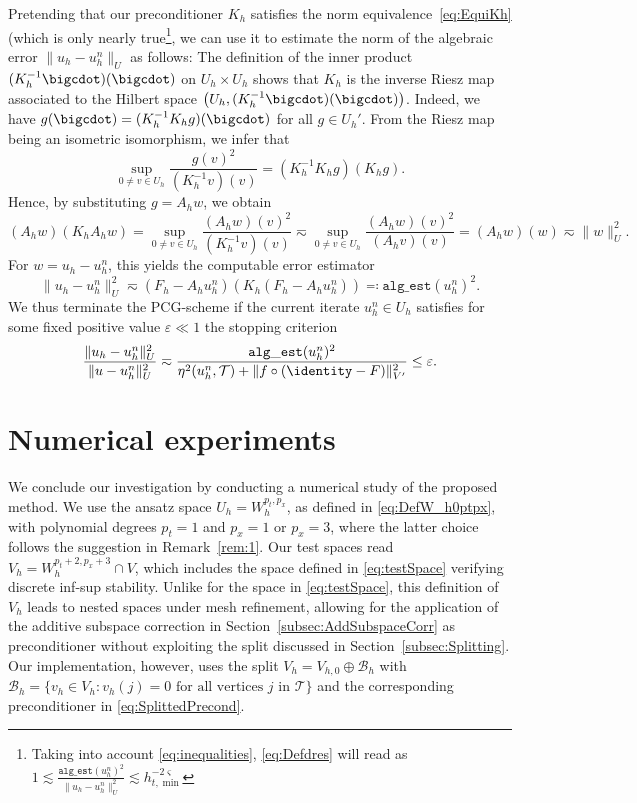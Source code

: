 \documentclass{amsart}
\providecommand{\tria}{\mathcal{T}}
\begin{document}
Pretending that our preconditioner $K_h$ satisfies the norm equivalence~\eqref{eq:EquiKh} (which is only nearly true\footnote{Taking into account \eqref{eq:inequalities}, \eqref{eq:Defdres} will read as $1 \lesssim \frac{\mathtt{alg\_est}(u_h^n)^2}{\lVert u_h - u_h^n \rVert_U^2} \lesssim h_{t,\min}^{-2\varsigma}$}, we can use it to estimate the norm of the algebraic error $\lVert u_h - u_h^n \rVert_U$ as follows:
The definition of the inner product $(K_h^{-1}\bigcdot)(\bigcdot)$ on $U_h \times U_h$ shows that $K_h$ is the inverse Riesz map associated to the Hilbert space $\big(U_h,(K_h^{-1}\bigcdot)(\bigcdot)\big)$. Indeed, we have $g(\bigcdot)=(K_h^{-1}K_h g)(\bigcdot)$ for all $g \in U_h'$.
From the Riesz map being an isometric isomorphism, we infer that
\begin{equation*}
\sup_{0 \neq v \in U_h}\frac{g(v)^2}{(K_h^{-1}v)(v)}=(K_h^{-1} K_h g)(K_h g).
\end{equation*}
Hence, by substituting $g=A_h w$, we obtain
\begin{equation*}
(A_h w)(K_h A_h w) =\sup_{0 \neq v \in U_h}\frac{(A_h w)(v)^2}{(K_h^{-1}v)(v)} \eqsim \sup_{0 \neq v \in U_h}\frac{(A_h w)(v)^2}{(A_h v)(v)}= (A_h w)(w) \eqsim \|w\|_U^2.
\end{equation*}
For $w=u_h - u_h^n$, this yields the computable error estimator
\begin{equation}\label{eq:Defdres}
\lVert u_h - u_h^n \rVert_U^2 \eqsim (F_h-A_h u_h^n)(K_h(F_h-A_h u_h^n))\eqqcolon \mathtt{alg\_est}(u_h^n)^2.
\end{equation}%
We thus terminate the PCG-scheme if the current iterate $u_h^n\in U_h$ satisfies for some fixed positive value $\varepsilon \ll 1$ the stopping criterion 
\begin{equation}\label{eq:StoppCrit}
\frac{\lVert u_h - u_h^n \rVert^2_U}{\lVert u - u_h^n \rVert^2_U} \eqsim \frac{\mathtt{alg\_est}(u_h^n)^2}{\eta^2(u_h^n,\tria) + \lVert f \circ (\identity - F)\rVert^2_{V'} } \leq \varepsilon.
\end{equation}

\section{Numerical experiments}\label{sec:NumExp}
We conclude our investigation by conducting a numerical study of the proposed method. We use the ansatz space $U_h = W_h^{p_t, p_x}$, as defined in \eqref{eq:DefW_h0ptpx}, with polynomial degrees $p_t = 1$ and $p_x = 1$ or $p_x = 3$, where the latter choice follows the suggestion in Remark~\ref{rem:1}.
Our test spaces read $V_h = W_h^{p_t+2, p_x+3} \cap V$, which includes the space defined in \eqref{eq:testSpace} verifying discrete inf-sup stability.
Unlike for the space in \eqref{eq:testSpace}, this definition of $V_h$ leads to nested spaces under mesh refinement, allowing for the application of the additive  subspace correction in Section~\ref{subsec:AddSubspaceCorr} as preconditioner without exploiting the split discussed in Section~\ref{subsec:Splitting}. Our implementation, however, uses the split $V_h = V_{h,0} \oplus \mathcal{B}_h$ with $\mathcal{B}_h = \lbrace v_h \in V_h\colon v_h(j) = 0\text{ for all vertices } j \text{ in }\tria\rbrace$ and the corresponding preconditioner in \eqref{eq:SplittedPrecond}.
\end{document}
